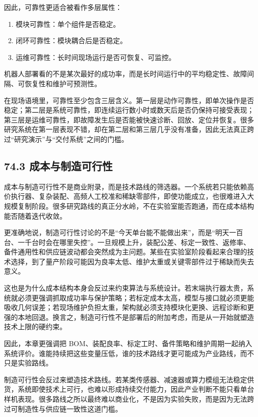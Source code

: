 因此，可靠性更适合被看作多层属性：

\begin{enumerate}
\item 模块可靠性：单个组件是否稳定。
\item 闭环可靠性：模块耦合后是否稳定。
\item 运维可靠性：长时间现场运行是否可恢复、可监控。
\end{enumerate}

机器人部署看的不是某次最好的成功率，而是长时间运行中的平均稳定性、故障间隔、可恢复性和维护可预测性。

在现场语境里，可靠性至少包含三层含义。第一层是动作可靠性，即单次操作是否稳定；第二层是系统可靠性，即连续运行数小时或数天后是否仍保持可接受表现；第三层是运维可靠性，即故障发生后是否能被快速诊断、回放、定位并恢复。很多研究系统在第一层表现不错，却在第二层和第三层几乎没有准备，因此无法真正跨过“研究演示”与“交付系统”之间的门槛。

\subsection*{74.3 成本与制造可行性}


成本与制造可行性不是商业附录，而是技术路线的筛选器。一个系统若只能依赖高价执行器、复杂装配、高频人工校准和稀缺零部件，即使功能成立，也很难进入大规模复制阶段。很多研究路线的真正分水岭，不在实验室能否跑通，而在成本结构能否随着迭代收敛。

更准确地说，制造可行性讨论的不是“今天单台能不能做出来”，而是“明天一百台、一千台时会在哪里失控”。一旦规模上升，装配公差、标定一致性、返修率、备件通用性和供应链波动都会突然成为主问题。某些在实验室阶段看起来合理的技术选择，到了量产阶段可能因为良率太低、维护太重或关键零部件过于稀缺而失去意义。

这也是为什么成本结构本身会反过来约束算法与系统设计。若末端执行器太贵，系统就必须更强调抓取成功率与保护策略；若标定成本太高，模型与接口就必须更能吸收几何误差；若现场维护负担太重，架构就必须支持模块化更换、远程诊断和更强的本地回退。换言之，制造可行性不是部署后的附加考虑，而是从一开始就塑造技术上限的硬约束。

因此，本章更强调把 BOM、装配良率、标定工时、备件策略和维护周期一起纳入系统评价。谁能持续把这些变量压低，谁的技术路线才更可能成为产业路线，而不只是实验路线。

制造可行性会反过来塑造技术路线。若某类传感器、减速器或算力模组无法稳定供货，系统即使技术上可行，也难以形成持续交付能力，因此产业判断不能只看单台样机表现。很多路线之所以最终难以商业化，不是因为实验失败，而是因为无法跨过可制造性与供应链一致性这道门槛。

